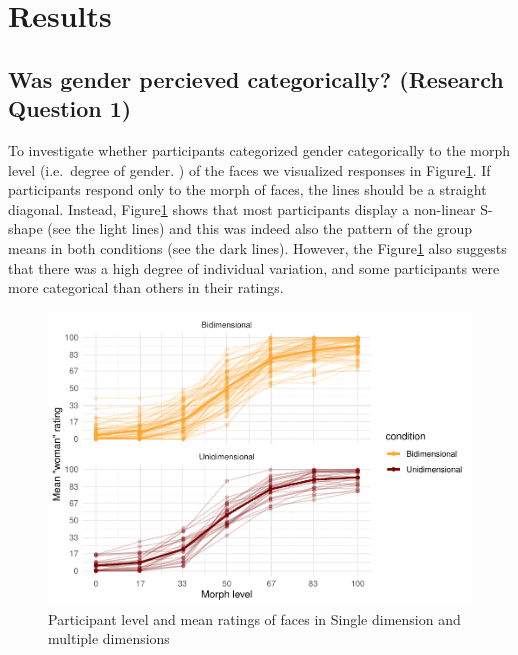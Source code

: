 \documentclass[
  man]{apa7}
\begin{document}
\hypertarget{results}{%
\section{Results}\label{results}}

\hypertarget{was-gender-percieved-categorically-research-question-1}{%
\subsection{Was gender percieved categorically? (Research Question 1)}\label{was-gender-percieved-categorically-research-question-1}}

To investigate whether participants categorized gender categorically to the morph level (i.e.~degree of gender. ) of the faces we visualized responses in Figure\ref{fig:descriptives-two}. If participants respond only to the morph of faces, the lines should be a straight diagonal. Instead, Figure\ref{fig:descriptives-two} shows that most participants display a non-linear S-shape (see the light lines) and this was indeed also the pattern of the group means in both conditions (see the dark lines). However, the Figure\ref{fig:descriptives-two} also suggests that there was a high degree of individual variation, and some participants were more categorical than others in their ratings.

\begin{figure}
\centering
\includegraphics{RO_revisions_doc_files/figure-latex/descriptives-two-1.pdf}
\caption{\label{fig:descriptives-two}Participant level and mean ratings of faces in Single dimension and multiple dimensions}
\end{figure}
\end{document}
